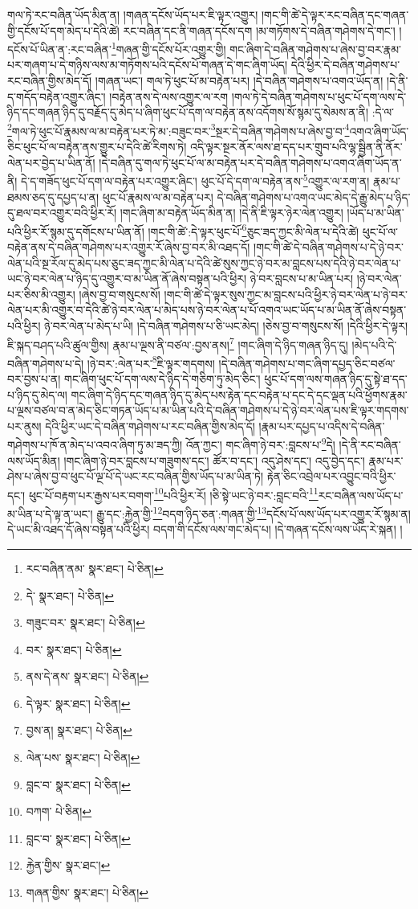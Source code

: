 གལ་ཏེ་རང་བཞིན་ཡོད་མིན་ན། །གཞན་དངོས་ཡོད་པར་ཇི་ལྟར་འགྱུར། །གང་གི་ཚེ་དེ་ལྟར་རང་བཞིན་དང་གཞན་གྱི་དངོས་པོ་དག་མེད་པ་དེའི་ཚེ། རང་བཞིན་དང་ནི་གཞན་དངོས་དག །མ་གཏོགས་དེ་བཞིན་གཤེགས་དེ་གང་། །དངོས་པོ་ཡིན་ན་:རང་བཞིན་\footnote{རང་བཞིན་ནམ་  སྣར་ཐང་།  པེ་ཅིན། }གཞན་གྱི་དངོས་པོར་འགྱུར་གྱི། གང་ཞིག་དེ་བཞིན་གཤེགས་པ་ཞེས་བྱ་བར་རྣམ་པར་གཞག་པ་དེ་གཉིས་ལས་མ་གཏོགས་པའི་དངོས་པོ་གཞན་དེ་གང་ཞིག་ཡོད། དེའི་ཕྱིར་དེ་བཞིན་གཤེགས་པ་རང་བཞིན་གྱིས་མེད་དོ། །གཞན་ཡང་། གལ་ཏེ་ཕུང་པོ་མ་བརྟེན་པར། །དེ་བཞིན་གཤེགས་པ་འགའ་ཡོད་ན། །དེ་ནི་ད་གདོད་བརྟེན་འགྱུར་ཞིང་། །བརྟེན་ནས་དེ་ལས་འགྱུར་ལ་རག །གལ་ཏེ་དེ་བཞིན་གཤེགས་པ་ཕུང་པོ་དག་ལས་དེ་ཉིད་དང་གཞན་ཉིད་དུ་བརྗོད་དུ་མེད་པ་ཞིག་ཕུང་པོ་དག་ལ་བརྟེན་ནས་འདོགས་སོ་སྙམ་དུ་སེམས་ན་ནི། :དེ་ལ་\footnote{དེ་  སྣར་ཐང་།  པེ་ཅིན། }གལ་ཏེ་ཕུང་པོ་རྣམས་ལ་མ་བརྟེན་པར་ཏེ་མ་:བཟུང་བར་\footnote{གཟུང་བར་  སྣར་ཐང་།  པེ་ཅིན། }སྔར་དེ་བཞིན་གཤེགས་པ་ཞེས་བྱ་བ་\footnote{བར་  སྣར་ཐང་།  པེ་ཅིན། }འགའ་ཞིག་ཡོད་ཅིང་ཕུང་པོ་ལ་བརྟེན་ནས་གྱུར་པ་དེའི་ཚེ་རིགས་ཏེ། འདི་ལྟར་སྔར་ནོར་ལས་ཐ་དད་པར་གྲུབ་པའི་ལྷ་སྦྱིན་ནི་ནོར་ལེན་པར་བྱེད་པ་ཡིན་ནོ། །དེ་བཞིན་དུ་གལ་ཏེ་ཕུང་པོ་ལ་མ་བརྟེན་པར་དེ་བཞིན་གཤེགས་པ་འགའ་ཞིག་ཡོད་ན་ནི། དེ་ད་གཟོད་ཕུང་པོ་དག་ལ་བརྟེན་པར་འགྱུར་ཞིང་། ཕུང་པོ་དེ་དག་ལ་བརྟེན་ནས་\footnote{ནས་དེ་ནས་  སྣར་ཐང་།  པེ་ཅིན། }འགྱུར་ལ་རག་ན། རྣམ་པ་ཐམས་ཅད་དུ་དཔྱད་པ་ན། ཕུང་པོ་རྣམས་ལ་མ་བརྟེན་པར། དེ་བཞིན་གཤེགས་པ་འགའ་ཡང་མེད་དེ་རྒྱུ་མེད་པ་ཉིད་དུ་ཐལ་བར་འགྱུར་བའི་ཕྱིར་རོ། །གང་ཞིག་མ་བརྟེན་ཡོད་མིན་ན། །དེ་ནི་ཇི་ལྟར་ཉེར་ལེན་འགྱུར། །ཡོད་པ་མ་ཡིན་པའི་ཕྱིར་རོ་སྙམ་དུ་དགོངས་པ་ཡིན་ནོ། །གང་གི་ཚེ་:དེ་ལྟར་ཕུང་པོ་\footnote{དེ་ལྟར་  སྣར་ཐང་།  པེ་ཅིན། }ཅུང་ཟད་ཀྱང་མི་ལེན་པ་དེའི་ཚེ། ཕུང་པོ་ལ་བརྟེན་ནས་དེ་བཞིན་གཤེགས་པར་འགྱུར་རོ་ཞེས་བྱ་བར་མི་འཐད་དོ། །གང་གི་ཚེ་དེ་བཞིན་གཤེགས་པ་དེ་ཉེ་བར་ལེན་པའི་སྔ་རོལ་དུ་མེད་པས་ཅུང་ཟད་ཀྱང་མི་ལེན་པ་དེའི་ཚེ་སུས་ཀྱང་ཉེ་བར་མ་བླངས་པས་དེའི་ཉེ་བར་ལེན་པ་ཡང་ཉེ་བར་ལེན་པ་ཉིད་དུ་འགྱུར་བ་མ་ཡིན་ནོ་ཞེས་བསྟན་པའི་ཕྱིར། ཉེ་བར་བླངས་པ་མ་ཡིན་པར། །ཉེ་བར་ལེན་པར་ཅིས་མི་འགྱུར། །ཞེས་བྱ་བ་གསུངས་སོ། །གང་གི་ཚེ་དེ་ལྟར་སུས་ཀྱང་མ་བླངས་པའི་ཕྱིར་ཉེ་བར་ལེན་པ་ཉེ་བར་ལེན་པར་མི་འགྱུར་བ་དེའི་ཚེ་ཉེ་བར་ལེན་པ་མེད་པས་ཉེ་བར་ལེན་པ་པོ་འགའ་ཡང་ཡོད་པ་མ་ཡིན་ནོ་ཞེས་བསྟན་པའི་ཕྱིར། ཉེ་བར་ལེན་པ་མེད་པ་ཡི། །དེ་བཞིན་གཤེགས་པ་ཅི་ཡང་མེད། །ཅེས་བྱ་བ་གསུངས་སོ། །དེའི་ཕྱིར་དེ་ལྟར། ཇི་སྐད་བཤད་པའི་ཚུལ་གྱིས། རྣམ་པ་ལྔས་ནི་བཙལ་:བྱས་ནས།\footnote{བྱས་ན།  སྣར་ཐང་།  པེ་ཅིན། } །གང་ཞིག་དེ་ཉིད་གཞན་ཉིད་དུ། །མེད་པའི་དེ་བཞིན་གཤེགས་པ་དེ། །ཉེ་བར་:ལེན་པར་\footnote{ལེན་པས་  སྣར་ཐང་།  པེ་ཅིན། }ཇི་ལྟར་གདགས། །དེ་བཞིན་གཤེགས་པ་གང་ཞིག་དཔྱད་ཅིང་བཙལ་བར་བྱས་པ་ན། གང་ཞིག་ཕུང་པོ་དག་ལས་དེ་ཉིད་དེ་གཅིག་ཏུ་མེད་ཅིང་། ཕུང་པོ་དག་ལས་གཞན་ཉིད་དུ་སྟེ་ཐ་དད་པ་ཉིད་དུ་མེད་ལ། གང་ཞིག་དེ་ཉིད་དང་གཞན་ཉིད་དུ་མེད་པས་རྟེན་དང་བརྟེན་པ་དང་དེ་དང་ལྡན་པའི་ཕྱོགས་རྣམ་པ་ལྔས་བཙལ་བ་ན་མེད་ཅིང་གཏན་ཡོད་པ་མ་ཡིན་པའི་དེ་བཞིན་གཤེགས་པ་དེ་ཉེ་བར་ལེན་པས་ཇི་ལྟར་གདགས་པར་ནུས། དེའི་ཕྱིར་ཡང་དེ་བཞིན་གཤེགས་པ་རང་བཞིན་གྱིས་མེད་དོ། །རྣམ་པར་དཔྱད་པ་འདིས་དེ་བཞིན་གཤེགས་པ་ཁོ་ན་མེད་པ་འབའ་ཞིག་ཏུ་མ་ཟད་ཀྱི། འོན་ཀྱང་། གང་ཞིག་ཉེ་བར་:བླངས་པ་\footnote{བླང་བ་  སྣར་ཐང་།  པེ་ཅིན། }དེ། །དེ་ནི་རང་བཞིན་ལས་ཡོད་མིན། །གང་ཞིག་ཉེ་བར་བླངས་པ་གཟུགས་དང་། ཚོར་བ་དང་། འདུ་ཤེས་དང་། འདུ་བྱེད་དང་། རྣམ་པར་ཤེས་པ་ཞེས་བྱ་བ་ཕུང་པོ་ལྔ་པོ་དེ་ཡང་རང་བཞིན་གྱིས་ཡོད་པ་མ་ཡིན་ཏེ། རྟེན་ཅིང་འབྲེལ་པར་འབྱུང་བའི་ཕྱིར་དང་། ཕུང་པོ་བརྟག་པར་རྒྱས་པར་བགག་\footnote{བཀག་  པེ་ཅིན། }པའི་ཕྱིར་རོ། །ཅི་སྟེ་ཡང་ཉེ་བར་:བླང་བའི་\footnote{བླང་བ་  སྣར་ཐང་།  པེ་ཅིན། }རང་བཞིན་ལས་ཡོད་པ་མ་ཡིན་པ་དེ་ལྟ་ན་ཡང་། རྒྱུ་དང་:རྐྱེན་གྱི་\footnote{རྐྱེན་གྱིས་  སྣར་ཐང་། }བདག་ཉིད་ཅན་:གཞན་གྱི་\footnote{གཞན་གྱིས་  སྣར་ཐང་།  པེ་ཅིན། }དངོས་པོ་ལས་ཡོད་པར་འགྱུར་རོ་སྙམ་ན། དེ་ཡང་མི་འཐད་དོ་ཞེས་བསྟན་པའི་ཕྱིར། བདག་གི་དངོས་ལས་གང་མེད་པ། །དེ་གཞན་དངོས་ལས་ཡོད་རེ་སྐན། །
